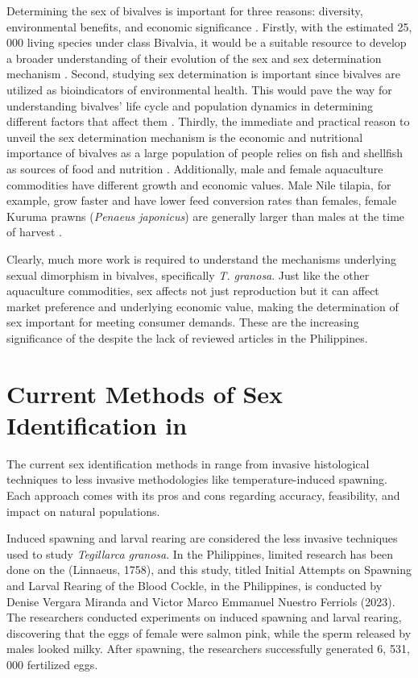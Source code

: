 Determining the sex of bivalves is important for three reasons: diversity, environmental benefits, and economic significance \cite{breton2010novel}. Firstly, with the estimated 25, 000 living species under class Bivalvia, it would be a suitable resource to develop a broader understanding of their evolution of the sex and sex determination mechanism  \cite{breton2010novel}. Second, studying sex determination is important since bivalves are utilized as bioindicators of environmental health. This would pave the way for understanding bivalves' life cycle and population dynamics in determining different factors that affect them \cite{campos2012}. Thirdly, the immediate and practical reason to unveil the sex determination mechanism is the economic and nutritional importance of bivalves as a large population of people relies on fish and shellfish as sources of food and nutrition \cite{naylor2000}. Additionally, male and female aquaculture commodities have different growth and economic values. Male Nile tilapia, for example, grow faster and have lower feed conversion rates than females, female Kuruma prawns (\textit{Penaeus japonicus}) are generally larger than males at the time of harvest \cite{budd}. 

Clearly, much more work is required to understand the mechanisms underlying sexual dimorphism in bivalves, specifically \textit{T. granosa}. Just like the other aquaculture commodities, sex affects not just reproduction but it can affect market preference and underlying economic value, making the determination of sex important for meeting consumer demands. These are the increasing significance of the \Tgranosa despite the lack of reviewed articles in the Philippines.

\section{Current Methods of Sex Identification in \Tegillarcagranosa}

The current sex identification methods in \Tegillarcagranosa range from invasive histological techniques to less invasive methodologies like temperature-induced spawning. Each approach comes with its pros and cons regarding accuracy, feasibility, and impact on natural populations.

Induced spawning and larval rearing are considered the less invasive techniques used to study \textit{Tegillarca granosa}. In the Philippines, limited research has been done on the \Tegillarcagranosa (Linnaeus, 1758), and this study, titled Initial Attempts on Spawning and Larval Rearing of the Blood Cockle, \Tegillarcagranosa in the Philippines, is conducted by Denise Vergara Miranda and Victor Marco Emmanuel Nuestro Ferriols (2023). The researchers conducted experiments on induced spawning and larval rearing, discovering that the eggs of female \Tgranosa were salmon pink, while the sperm released by males looked milky. After spawning, the researchers successfully generated 6, 531, 000 fertilized eggs.

